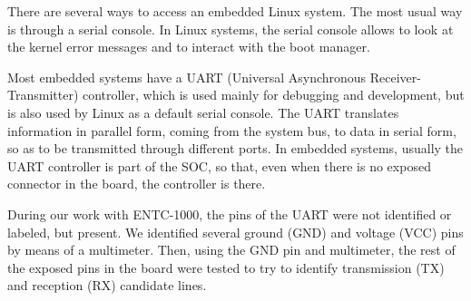 \documentclass[conference]{IEEEtran}
\newcommand{\nota}[1]{}
\begin{document}
There are several ways to access an embedded Linux system. The most usual way is through a serial console. In Linux systems, the serial console allows to look at the kernel error messages and to interact with the boot manager.

\nota{ La mayoría de los sistemas embebidos contienen un controlador 
UART (del inglés ``Universal Asynchronous Receiver-Transmitter''),
utilizado principalmente para depuración y desarrollo.
Pero que también es utilizado por Linux como la interfaz serie
predeterminada.
El UART traduce la información en formato paralelo
provenientes del bus del sistema, a datos en formato serie,
para que puedan ser transmitidos a través de diferentes puertos.
En los sistemas embebidos, generalmente, el controlador UART es parte de la CPU,
por lo que, aunque no exista un conector expuesto en la placa, generalmente
está presente.
}

Most embedded systems have a UART (Universal Asynchronous Receiver-Transmitter) controller, which is used mainly for debugging and development, but is also used by Linux as a default serial console.
The UART translates information in parallel form, coming from the system bus, to data in serial form, so as to be transmitted through different ports. In embedded systems, usually the UART controller is part of the SOC, so that, even when there is no exposed connector in the board, the controller is there. 

\nota{
En nuestro trabajo con el ENTC-1000, los contactos (en inglés ``pins'') del UART
no se encontraban identificados o etiquetados, pero estaban presentes.
Utilizando un multímetro y un osciloscopio, se identificaron contactos
de tierra (GND) y de voltaje de corriente directa (VCC). Luego, utilizando
el contacto tierra, se probaron los demás contactos expuestos en la placa,
para identificar el contacto de transmisión (TX), y recepción (RX).
}
During our work with ENTC-1000, the pins of the UART were not identified or labeled, but present. We identified several ground (GND) and voltage (VCC) pins by means of a multimeter. Then, using the GND pin and multimeter, the rest of the exposed pins in the board were tested to try to identify transmission (TX) and reception (RX) candidate lines.
  

\nota {Para corroborar que los contactos del UART son los correctos, se conectó
el conversor de nivel RS-232 a los mismos, y luego a una PC.
Finalmente, se utilizó el programa de comunicaciones minicom para
obtener, al menos, información visual sin sentido, ya que
no se conocía a que velocidad de transmisión se encuentra operando
el firmware original.
}
\end{document}
